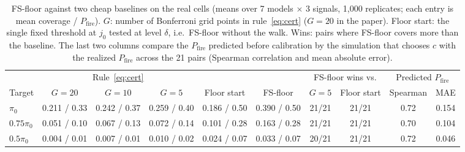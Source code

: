 \begin{table}[H]
\centering\scriptsize
\caption{FS-floor against two cheap baselines on the real cells (means over 7 models $\times$ 3 signals, 1{,}000 replicates; each entry is mean coverage / $P_{\mathrm{fire}}$). $G$: number of Bonferroni grid points in rule~\eqref{eq:cert} ($G=20$ in the paper). Floor start: the single fixed threshold at $j_0$ tested at level $\delta$, i.e.\ FS-floor without the walk. Wins: pairs where FS-floor covers more than the baseline. The last two columns compare the $P_{\mathrm{fire}}$ predicted before calibration by the simulation that chooses $c$ with the realized $P_{\mathrm{fire}}$ across the 21 pairs (Spearman correlation and mean absolute error).}
\label{tab:baselines}
\setlength{\tabcolsep}{3.5pt}
\begin{tabular}{l ccccc cc cc}
\toprule
 & \multicolumn{3}{c}{Rule~\eqref{eq:cert}} & & & \multicolumn{2}{c}{FS-floor wins vs.} & \multicolumn{2}{c}{Predicted $P_{\mathrm{fire}}$} \\
\cmidrule(lr){2-4}\cmidrule(lr){7-8}\cmidrule(lr){9-10}
Target & $G{=}20$ & $G{=}10$ & $G{=}5$ & Floor start & FS-floor & $G{=}5$ & Floor start & Spearman & MAE \\
\midrule
$\pi_0$ & 0.211 / 0.33 & 0.242 / 0.37 & 0.259 / 0.40 & 0.186 / 0.50 & 0.390 / 0.50 & 21/21 & 21/21 & 0.72 & 0.154 \\
$0.75\pi_0$ & 0.051 / 0.10 & 0.067 / 0.13 & 0.072 / 0.14 & 0.101 / 0.28 & 0.163 / 0.28 & 21/21 & 21/21 & 0.70 & 0.104 \\
$0.5\pi_0$ & 0.004 / 0.01 & 0.007 / 0.01 & 0.010 / 0.02 & 0.024 / 0.07 & 0.033 / 0.07 & 20/21 & 21/21 & 0.72 & 0.046 \\
\bottomrule
\end{tabular}
\end{table}

